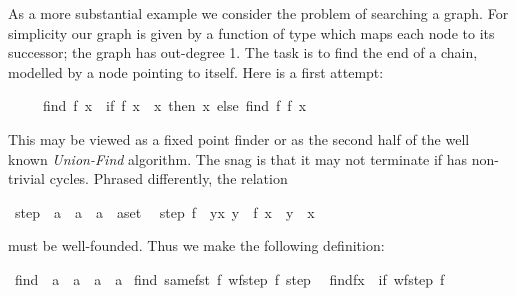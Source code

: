 \begin{isabellebody}
\begin{isamarkuptext}
As a more substantial example we consider the problem of searching a graph.
For simplicity our graph is given by a function  of
type  which
maps each node to its successor; the graph has out-degree 1.
The task is to find the end of a chain, modelled by a node pointing to
itself. Here is a first attempt:
\begin{isabelle}%
\ \ \ \ \ find\ {\isacharparenleft}f{\isacharcomma}\ x{\isacharparenright}\ {\isacharequal}\ {\isacharparenleft}if\ f\ x\ {\isacharequal}\ x\ then\ x\ else\ find\ {\isacharparenleft}f{\isacharcomma}\ f\ x{\isacharparenright}{\isacharparenright}%
\end{isabelle}
This may be viewed as a fixed point finder or as the second half of the well
known \emph{Union-Find} algorithm.
The snag is that it may not terminate if  has non-trivial cycles.
Phrased differently, the relation%
\end{isamarkuptext}%
\isamarkuptrue%
\ step{}\ {\isacharcolon}{\isacharcolon}\ {\isachardoublequote}{\isacharparenleft}{\isacharprime}a\ {\isasymRightarrow}\ {\isacharprime}a{\isacharparenright}\ {\isasymRightarrow}\ {\isacharparenleft}{\isacharprime}a\ {\isasymtimes}\ {\isacharprime}a{\isacharparenright}set{\isachardoublequote}\isanewline
\ \ {\isachardoublequote}step{}\ f\ {\isasymequiv}\ {\isacharbraceleft}{\isacharparenleft}y{\isacharcomma}x{\isacharparenright}{\isachardot}\ y\ {\isacharequal}\ f\ x\ {\isasymand}\ y\ {\isasymnoteq}\ x{\isacharbraceright}{\isachardoublequote}\isamarkupfalse%
%
\begin{isamarkuptext}%
\noindent
must be well-founded. Thus we make the following definition:%
\end{isamarkuptext}%
\isamarkuptrue%
\ find\ {\isacharcolon}{\isacharcolon}\ {\isachardoublequote}{\isacharparenleft}{\isacharprime}a\ {\isasymRightarrow}\ {\isacharprime}a{\isacharparenright}\ {\isasymtimes}\ {\isacharprime}a\ {\isasymRightarrow}\ {\isacharprime}a{\isachardoublequote}\isanewline
\isamarkupfalse%
\ find\ {\isachardoublequote}same{\isacharunderscore}fst\ {\isacharparenleft}{\isasymlambda}f{\isachardot}\ wf{\isacharparenleft}step{}\ f{\isacharparenright}{\isacharparenright}\ step{}{\isachardoublequote}\isanewline
\ \ {\isachardoublequote}find{\isacharparenleft}f{\isacharcomma}x{\isacharparenright}\ {\isacharequal}\ {\isacharparenleft}if\ wf{\isacharparenleft}step{}\ f{\isacharparenright}\isanewline

\end{isabellebody}
